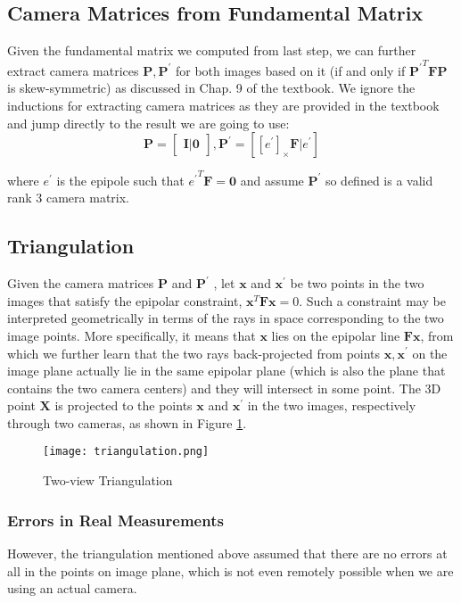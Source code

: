 \documentclass[conference]{IEEEtran}
\newcommand{\mat}[1]{\mathbf{#1}} %
\begin{document}
\subsection{Camera Matrices from Fundamental Matrix}
Given the fundamental matrix we computed from last step, we can further extract camera matrices $\mat{P}, \mat{P}^\prime$ for both images based on it (if and only if $\mat{P^\prime}^T\mat{F}\mat{P}$ is skew-symmetric) as discussed in Chap. 9 of the textbook. We ignore the inductions for extracting camera matrices as they are provided in the textbook and jump directly to the result we are going to use:
\begin{equation}
	\mat{P} = \begin{bmatrix}
			\mat{I} | \mat{0}
		\end{bmatrix}, 
	\mat{P}^\prime = [[e^\prime]_{\times}\mat{F} | e^\prime]
\end{equation}

where $e^\prime $ is the epipole such that ${e^\prime}^T \mat{F} = \mat{0}$ and assume $\mat{P}^\prime$ so defined is a valid rank 3 camera matrix.

\subsection{Triangulation}
Given the camera matrices $\mat{P}$ and $\mat{P}^\prime$ , let $\mat{x}$ and $\mat{x}^\prime$ be two points in the two images that satisfy the epipolar constraint, $\mat{x}^T\mat{F}\mat{x} = 0$. Such a constraint may be interpreted geometrically in terms of the rays in space corresponding to the two image points. More specifically, it means that $\mat{x}$ lies on the epipolar line $\mat{F}\mat{x}$, from which we further learn that the two rays back-projected from points $\mat{x}, \mat{x}^\prime$ on the image plane actually lie in the same epipolar plane (which is also the plane that contains the two camera centers) and they will intersect in some point. The 3D point $\mat{X}$ is projected to the points $\mat{x}$ and $\mat{x}^\prime$ in the two images, respectively through two cameras, as shown in Figure \ref{triangulation}.
\begin{figure}[hbpt]
  \centering \texttt{[image: triangulation.png]}
  \caption{Two-view Triangulation}
  \label{triangulation}
\end{figure}

\subsubsection{Errors in Real Measurements}
However, the triangulation mentioned above assumed that there are no errors at all in the points on image plane, which is not even remotely possible when we are using an actual camera. 
\end{document}
